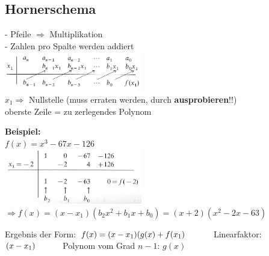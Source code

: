 \begin{flushleft}
		\subsection{Hornerschema}
			\begin{minipage}[t]{9cm}
				- Pfeile $\Rightarrow$ Multiplikation\\
				- Zahlen pro Spalte werden addiert\\
				\includegraphics[width=6cm]{./bilder/hornerschema_1.png}	\\
				$x_1 \Rightarrow$ Nullstelle (muss erraten werden, durch \textbf{ausprobieren}!!)\\
				oberste Zeile = zu zerlegendes Polynom			
			\end{minipage}
			\begin{minipage}[t]{9cm}
				\textbf{Beispiel:}\\
				$f(x) = x^3-67x-126$\\
				\includegraphics[width=6cm]{./bilder/hornerschema_2.png}\\
				$\Rightarrow f(x) = (x-x_1)(b_2x^2 + b_1x + b_0) = (x+2)(x^2-2x-63)$	
			\end{minipage}
			Ergebnis der Form: $f(x)=(x-x_1)(g(x)+f(x_1)\hspace*{1cm}$ Linearfaktor: $(x-x_1)\hspace*{1cm}$ Polynom vom Grad $n-1$: $g(x)$ \\
		

\end{flushleft}
